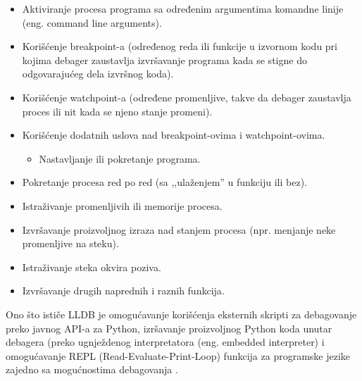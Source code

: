 \documentclass[a4paper]{article}
\begin{document}
\begin{itemize}
	\item{Aktiviranje procesa programa sa određenim argumentima komandne linije
		(eng. command line arguments).}
	
	\item{Korišćenje breakpoint-a (određenog reda ili funkcije u izvornom kodu pri
		kojima debager zaustavlja izvršavanje programa kada se stigne do odgovarajućeg
		dela izvršnog koda).}
	
	\item{Korišćenje watchpoint-a (određene promenljive, takve da debager zaustavlja
		proces ili nit kada se njeno stanje promeni).}
	
	\item{Korišćenje dodatnih uslova nad breakpoint-ovima i watchpoint-ovima.}
	\begin{itemize}
		\item{Nastavljanje ili pokretanje programa.}
	\end{itemize}
	
	\item{Pokretanje procesa red po red (sa ,,ulaženjem'' u funkciju ili bez).}
	
	\item{Istraživanje promenljivih ili memorije procesa.}
	
	\item{Izvršavanje proizvoljnog izraza nad stanjem procesa (npr. menjanje neke
		promenljive na steku).}
	
	\item{Istraživanje steka okvira poziva.}
	
	\item{Izvršavanje drugih naprednih i raznih funkcija.}
\end{itemize}

Ono što ističe LLDB je omogućavanje korišćenja eksternih skripti za debagovanje
preko javnog API-a za Python, izršavanje proizvoljnog Python koda unutar
debagera \cite{lldb_python} (preko ugnježdenog interpretatora (eng. embedded
interpreter) i omogućavanje REPL (Read-Evaluate-Print-Loop) funkcija za
programske jezike zajedno sa mogućnostima debagovanja \cite{swift_lldb_repl}.
\end{document}

